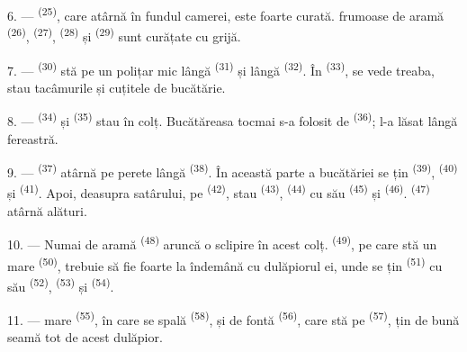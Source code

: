 \VUsaut{4.0mm}
\VUsaut{3.0mm}

6. ---  \textsuperscript{(25)}, care atârnă în fundul
camerei, este foarte curată.  frumoase de aramă
\textsuperscript{(26)},  \textsuperscript{(27)},
 \textsuperscript{(28)} și 
\textsuperscript{(29)} sunt curățate cu grijă.

7. ---  \textsuperscript{(30)} stă pe un polițar mic lângă
 \textsuperscript{(31)} și lângă 
\textsuperscript{(32)}. În  \textsuperscript{(33)}, se vede treaba,
stau tacâmurile și cuțitele de bucătărie.

8. ---  \textsuperscript{(34)} și 
\textsuperscript{(35)} stau în colț. Bucătăreasa tocmai s-a folosit de
 \textsuperscript{(36)}; l-a lăsat lângă fereastră.

9. ---  \textsuperscript{(37)} atârnă pe perete lângă
 \textsuperscript{(38)}. În această parte a bucătăriei se țin
 \textsuperscript{(39)}, 
\textsuperscript{(40)} și  \textsuperscript{(41)}. Apoi,
deasupra satârului, pe  \textsuperscript{(42)}, stau
 \textsuperscript{(43)},  \textsuperscript{(44)} cu
 său \textsuperscript{(45)} și 
\textsuperscript{(46)}.  \textsuperscript{(47)} atârnă alături.

10. --- Numai  de aramă \textsuperscript{(48)} aruncă o sclipire
în acest colț.  \textsuperscript{(49)}, pe care stă un
 mare \textsuperscript{(50)}, trebuie să fie foarte la îndemână cu
dulăpiorul ei, unde se țin  \textsuperscript{(51)} cu
 său \textsuperscript{(52)}, 
\textsuperscript{(53)} și  \textsuperscript{(54)}.

\VUsaut{4.0mm}
\VUsaut{3.0mm}

11. ---  mare \textsuperscript{(55)}, în care se spală
 \textsuperscript{(58)}, și  de fontă
\textsuperscript{(56)}, care stă pe 
\textsuperscript{(57)}, țin de bună seamă tot de acest dulăpior.

